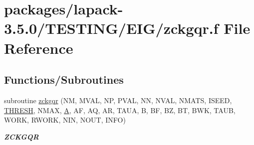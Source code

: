 \hypertarget{zckgqr_8f}{}\section{packages/lapack-\/3.5.0/\+T\+E\+S\+T\+I\+N\+G/\+E\+I\+G/zckgqr.f File Reference}
\label{zckgqr_8f}
\subsection*{Functions/\+Subroutines}
\begin{DoxyCompactItemize}
\item 
subroutine \hyperlink{group__complex16__eig_gac50da824da9466bc66bfe055ebd480ae}{zckgqr} (N\+M, M\+V\+A\+L, N\+P, P\+V\+A\+L, N\+N, N\+V\+A\+L, N\+M\+A\+T\+S, I\+S\+E\+E\+D, \hyperlink{zlaqgs_8c_a0656018abfc9fa2821827415f5d5ea57}{T\+H\+R\+E\+S\+H}, N\+M\+A\+X, \hyperlink{classA}{A}, A\+F, A\+Q, A\+R, T\+A\+U\+A, B, B\+F, B\+Z, B\+T, B\+W\+K, T\+A\+U\+B, W\+O\+R\+K, R\+W\+O\+R\+K, N\+I\+N, N\+O\+U\+T, I\+N\+F\+O)
\begin{DoxyCompactList}\small\item\em {\bfseries Z\+C\+K\+G\+Q\+R} \end{DoxyCompactList}\end{DoxyCompactItemize}
